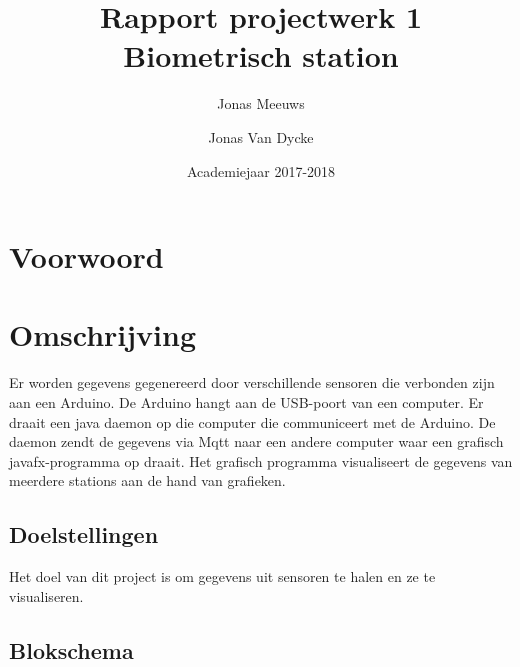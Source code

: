 \documentclass[a4paper]{report}
\title{Rapport projectwerk 1\\ Biometrisch station}
\author{Jonas Meeuws \and Jonas Van Dycke}
\date{Academiejaar 2017-2018}
\begin{document}
\maketitle
\tableofcontents

\chapter{Voorwoord}

\chapter{Omschrijving}
    Er worden gegevens gegenereerd door verschillende sensoren die verbonden zijn aan een Arduino.
    De Arduino hangt aan de USB-poort van een computer.
    Er draait een java daemon op die computer die communiceert met de Arduino.
    De daemon zendt de gegevens via Mqtt naar een andere computer waar een grafisch javafx-programma op draait.
    Het grafisch programma visualiseert de gegevens van meerdere stations aan de hand van grafieken.

    \section{Doelstellingen}
        Het doel van dit project is om gegevens uit sensoren te halen en ze te visualiseren.
        
    \section{Blokschema}
        
\end{document}
